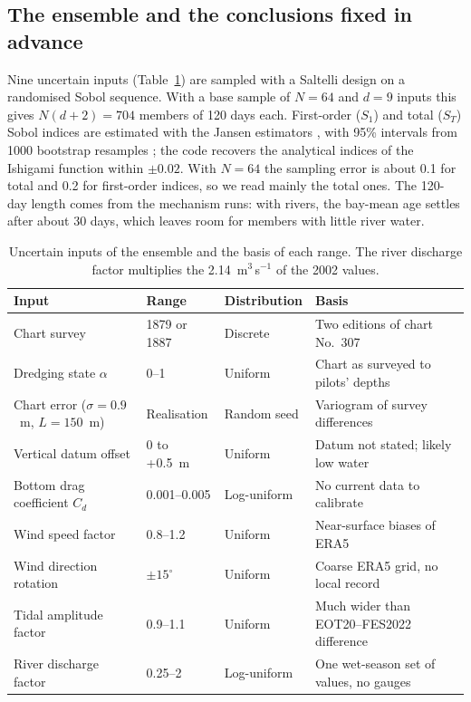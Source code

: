 \documentclass[a4paper,fleqn]{ems-dc}
\begin{document}
\subsection{The ensemble and the conclusions fixed in advance}\label{sec:ensemble}
Nine uncertain inputs (Table~\ref{tab:params}) are sampled with a Saltelli design
\citep{Saltelli2002} on a randomised Sobol sequence. With a base sample of $N = 64$ and
$d = 9$ inputs this gives $N(d+2) = 704$ members of 120 days each. First-order ($S_1$) and
total ($S_T$) Sobol indices are estimated with the Jansen estimators
\citep{Jansen1999,Saltelli2010}, with 95\% intervals from 1000 bootstrap resamples
\citep{Archer1997}; the code recovers the analytical indices of the Ishigami function
\citep{Ishigami1990} within $\pm 0.02$. With $N = 64$ the sampling error is about 0.1 for
total and 0.2 for first-order indices, so we read mainly the total ones. The 120-day length
comes from the mechanism runs: with rivers, the bay-mean age settles after about 30 days,
which leaves room for members with little river water.

\begin{table}[!t]
\centering
\caption{Uncertain inputs of the ensemble and the basis of each range. The river discharge
factor multiplies the 2.14~m$^3$\,s$^{-1}$ of the 2002 values.}\label{tab:params}
\begin{tabular}{llll}
\toprule
Input & Range & Distribution & Basis\\
\midrule
Chart survey & 1879 or 1887 & Discrete & Two editions of chart No.~307\\
Dredging state $\alpha$ & 0--1 & Uniform & Chart as surveyed to pilots' depths\\
Chart error ($\sigma = 0.9$~m, $L = 150$~m) & Realisation & Random seed & Variogram of
survey differences\\
Vertical datum offset & 0 to +0.5~m & Uniform & Datum not stated; likely low water\\
Bottom drag coefficient $C_d$ & 0.001--0.005 & Log-uniform & No current data to calibrate\\
Wind speed factor & 0.8--1.2 & Uniform & Near-surface biases of ERA5\\
Wind direction rotation & $\pm 15^\circ$ & Uniform & Coarse ERA5 grid, no local record\\
Tidal amplitude factor & 0.9--1.1 & Uniform & Much wider than EOT20--FES2022 difference\\
River discharge factor & 0.25--2 & Log-uniform & One wet-season set of values, no gauges\\
\bottomrule
\end{tabular}
\end{table}
\end{document}
